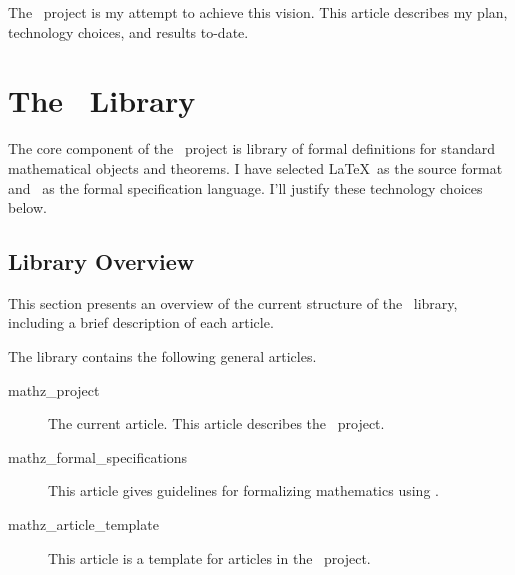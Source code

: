 \documentclass{amsart}
\begin{document}
The \mathz\ project is my attempt to achieve this vision.
This article describes my plan, technology choices, and results to-date.

\section{The \mathz\ Library}

The core component of the \mathz\ project is library of formal definitions for standard mathematical objects and theorems.
I have selected \LaTeX\ as the source format and \ZN\ as the formal specification language.
I'll justify these technology choices below.

\subsection{Library Overview}

This section presents an overview of the current structure of the \mathz\ library, 
including a brief description of each article.

The library contains the following general articles.
\begin{description}
\item[mathz\_project] The current article. This article describes the \mathz\ project.
\item[mathz\_formal\_specifications] This article gives guidelines for formalizing mathematics using \ZN.
\item[mathz\_article\_template] This article is a template for articles in the \mathz\ project.
\end{description}
\end{document}
